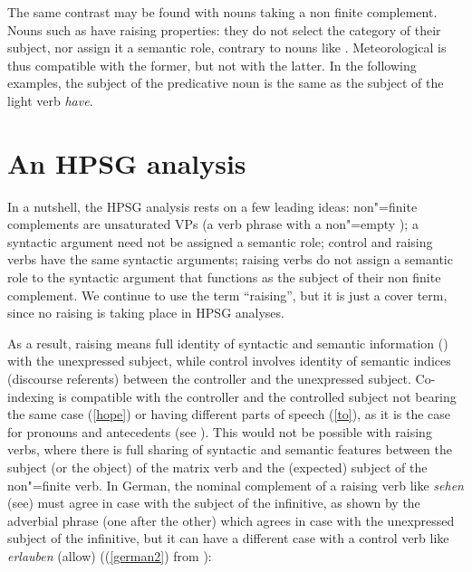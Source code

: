 \documentclass[output=paper
	        ,collection
	        ,collectionchapter
 	        ,biblatex
                ,babelshorthands
                ,newtxmath
                ,draftmode
                ,colorlinks, citecolor=brown
]{langscibook}
\begin{document}
\eal
{}
\zl

The same contrast may be found with  nouns taking a non finite complement. Nouns such as  have raising properties: they do not select the category of their subject, nor assign it a semantic role, contrary to nouns like . Meteorological  is thus compatible with the former, but not with the latter. In the following examples, the subject of the predicative noun is the same as the subject of the light verb \emph{have}.


\eal
{}
\zl

\section{An HPSG analysis}


In a nutshell, the HPSG analysis rests on a few leading ideas: non"=finite complements are unsaturated VPs (a verb phrase with a non"=empty \subjl); a syntactic argument need not be assigned a semantic role; control and raising verbs have the same syntactic arguments; raising verbs do not assign a semantic role to the syntactic argument that functions as the subject of their non finite complement. We continue to use the term ``raising'', but it is just a cover term, since no raising is taking place in HPSG analyses.

As a result,  raising means full identity of syntactic and semantic information ()  with the unexpressed subject, while control involves identity of semantic indices (discourse referents) between the controller and the unexpressed subject. Co-indexing is compatible with the controller and the controlled subject not bearing the same case (\ref{hope}) or having different parts of speech (\ref{to}), as it is the case for pronouns and antecedents (see ). This would not be possible with raising verbs, where there is full sharing of syntactic and semantic features between the subject (or the object) of the matrix verb and the (expected) subject of the non"=finite verb. In German, the nominal complement of a raising verb like \emph{sehen} (see) must agree in case with the subject of the infinitive, as shown by the adverbial phrase (one after the other) which agrees in case with the unexpressed subject of the infinitive, but it can have a different case with a control verb like \emph{erlauben} (allow) ((\ref{german2}) from ):
\end{document}

